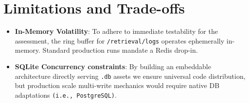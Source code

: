 \documentclass[11pt,a4paper]{article}
\begin{document}
\section{Limitations and Trade-offs}
\begin{itemize}
    \item \textbf{In-Memory Volatility}: To adhere to immediate testability for the assessment, the ring buffer for \texttt{/retrieval/logs} operates ephemerally in-memory. Standard production runs mandate a Redis drop-in.
    \item \textbf{SQLite Concurrency constraints}: By building an embeddable architecture directly serving \texttt{.db} assets we ensure universal code distribution, but production scale multi-write mechanics would require native DB adaptations \texttt{(i.e., PostgreSQL)}.
\end{itemize}
\end{document}
